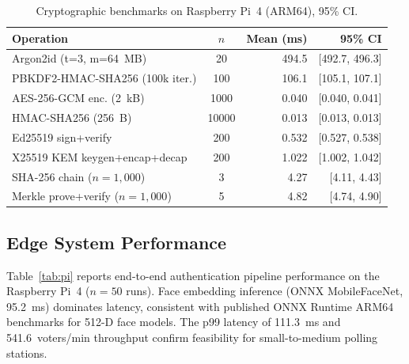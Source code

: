 \documentclass[preprint,12pt]{elsarticle}
\begin{document}
\begin{table}[t]
\centering
\caption{Cryptographic benchmarks on Raspberry Pi~4 (ARM64), 95\% CI.}
\label{tab:crypto}
\begin{tabular}{lcrr}
  \toprule
  Operation & $n$ & Mean (ms) & 95\% CI \\
  \midrule
  Argon2id (t=3, m=64~MB)         & 20     & 494.5  & [492.7, 496.3] \\
  PBKDF2-HMAC-SHA256 (100k iter.) & 100    & 106.1  & [105.1, 107.1] \\
  AES-256-GCM enc. (2~kB)         & 1000   & 0.040  & [0.040, 0.041] \\
  HMAC-SHA256 (256~B)             & 10000  & 0.013  & [0.013, 0.013] \\
  Ed25519 sign+verify             & 200    & 0.532  & [0.527, 0.538] \\
  X25519 KEM keygen+encap+decap   & 200    & 1.022  & [1.002, 1.042] \\
  SHA-256 chain ($n=1{,}000$)     & 3      & 4.27   & [4.11, 4.43]   \\
  Merkle prove+verify ($n=1{,}000$) & 5    & 4.82   & [4.74, 4.90]   \\
  \bottomrule
\end{tabular}
\end{table}

\subsection{Edge System Performance}

Table~\ref{tab:pi} reports end-to-end authentication pipeline performance
on the Raspberry Pi~4 ($n=50$ runs). Face embedding inference (ONNX
MobileFaceNet, 95.2~ms) dominates latency, consistent with published ONNX
Runtime ARM64 benchmarks for 512-D face models. The p99 latency of
111.3~ms and 541.6~voters/min throughput confirm feasibility for
small-to-medium polling stations.
\end{document}
